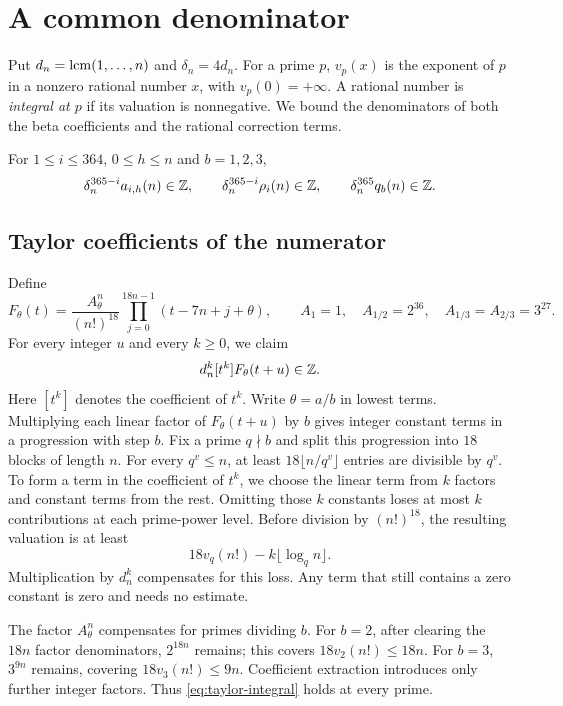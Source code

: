 \section{A common denominator}\label{sec:arithmetic}

Put $d_n=\operatorname{lcm}(1,\ldots,n)$ and $\delta_n=4d_n$. For a prime $p$,
$v_p(x)$ is the exponent of $p$ in a nonzero rational number $x$, with
$v_p(0)=+\infty$. A rational number is \emph{integral at $p$} if its
valuation is nonnegative. We bound the denominators of both the beta
coefficients and the rational correction terms.

\begin{proposition}\label{prop:denominators}
For $1\leq i\leq364$, $0\leq h\leq n$ and $b=1,2,3$,
\begin{equation}\label{eq:denominators}
 \delta_n^{365-i}a_{i,h}(n)\in\mathbb Z,\qquad
 \delta_n^{365-i}\rho_i(n)\in\mathbb Z,\qquad
 \delta_n^{365}q_b(n)\in\mathbb Z.
\end{equation}
\end{proposition}

\subsection{Taylor coefficients of the numerator}

Define
\[
 F_\theta(t)=\frac{A_\theta^n}{(n!)^{18}}
          \prod_{j=0}^{18n-1}(t-7n+j+\theta),
 \qquad
 A_1=1,\quad A_{1/2}=2^{36},\quad A_{1/3}=A_{2/3}=3^{27}.
\]
For every integer $u$ and every $k\geq0$, we claim
\begin{equation}\label{eq:taylor-integral}
 d_n^k[t^k]F_\theta(t+u)\in\mathbb Z.
\end{equation}
Here $[t^k]$ denotes the coefficient of $t^k$. Write $\theta=a/b$ in
lowest terms. Multiplying each linear factor of $F_\theta(t+u)$ by $b$
gives integer constant terms in a progression with step $b$.
Fix a prime $q\nmid b$ and split this progression into $18$ blocks of
length $n$. For every $q^v\leq n$, at least
$18\lfloor n/q^v\rfloor$ entries are divisible by $q^v$.
To form a term in the coefficient of $t^k$, we choose the linear term
from $k$ factors and constant terms from the rest. Omitting those $k$ constants
loses at most $k$ contributions at each prime-power level. Before
division by $(n!)^{18}$, the resulting valuation is at least
\[
 18v_q(n!)-k\lfloor\log_q n\rfloor.
\]
Multiplication by $d_n^k$ compensates for this loss. Any term that
still contains a zero constant is zero and needs no estimate.

The factor $A_\theta^n$ compensates for primes dividing $b$.
For $b=2$, after clearing the $18n$ factor denominators, $2^{18n}$
remains; this covers $18v_2(n!)\leq18n$.
For $b=3$, $3^{9n}$ remains, covering $18v_3(n!)\leq9n$.
Coefficient extraction introduces only further integer factors.
Thus \eqref{eq:taylor-integral} holds at every prime.


